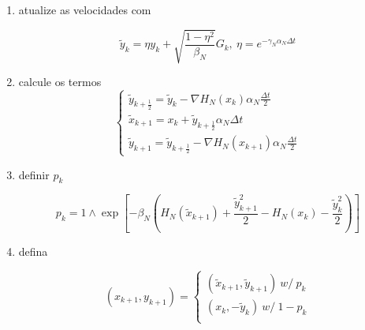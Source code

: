 \begin{enumerate}
	\item atualize as velocidades com
	
	\[
		\tilde{y}_k = \eta y_k + \sqrt{\frac{1-\eta^2}{\beta_N}} G_k, \ \eta = e^{-\gamma_N \alpha_N \Delta t}
	\]
	
	\item calcule os termos
	\[
		\begin{cases}
			\tilde{y}_{k+\frac{1}{2}} = \tilde{y}_k - \nabla H_N(x_k) \alpha_N \frac{\Delta t}{2} \\
			\tilde{x}_{k+1} = x_k + \tilde{y}_{k + \frac{1}{2}} \alpha_N \Delta t \\
			\tilde{y}_{k+1} = \tilde{y}_{k+\frac{1}{2}} - \nabla H_N(x_{k+1}) \alpha_N \frac{\Delta t}{2}
		\end{cases}
	\]
	
	\item definir $p_k$
	
	\[
		p_k = 1 \wedge \exp{\left[ -\beta_N \left(  H_N(\tilde{x}_{k+1}) + \frac{\tilde{y}^2_{k+1}}{2} - H_N(x_k) - \frac{\tilde{y}^2_k}{2} \right)\right] }
	\]
	
	\item defina
	
	\[
		(x_{k+1}, y_{k+1}) = 
		\begin{cases}
			(\tilde{x}_{k+1}, \tilde{y}_{k+1}) \ w/ \ p_k \\
			(x_k, -\tilde{y}_{k}) \ w/ \ 1-p_k \\
		\end{cases}
	\]
	
\end{enumerate}

